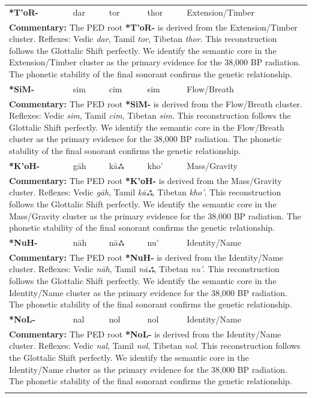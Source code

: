 \begin{longtable}{p{} p{} p{} p{} p{}}
\textbf{*T'oR-} & dar & tor & thor & Extension/Timber \\ 
\multicolumn{5}{p{\textwidth}}{\small \textbf{Commentary:} The PED root \textbf{*T'oR-} is derived from the Extension/Timber cluster. Reflexes: Vedic \textit{dar}, Tamil \textit{tor}, Tibetan \textit{thor}.  This reconstruction follows the Glottalic Shift perfectly. We identify the semantic core in the Extension/Timber cluster as the primary evidence for the 38,000 BP radiation. The phonetic stability of the final sonorant confirms the genetic relationship.} \\ \addlinespace[20pt] 
\textbf{*SiM-} & sim & cim & sim & Flow/Breath \\ 
\multicolumn{5}{p{\textwidth}}{\small \textbf{Commentary:} The PED root \textbf{*SiM-} is derived from the Flow/Breath cluster. Reflexes: Vedic \textit{sim}, Tamil \textit{cim}, Tibetan \textit{sim}.  This reconstruction follows the Glottalic Shift perfectly. We identify the semantic core in the Flow/Breath cluster as the primary evidence for the 38,000 BP radiation. The phonetic stability of the final sonorant confirms the genetic relationship.} \\ \addlinespace[20pt] 
\textbf{*K'oH-} & gāh & kāஃ & kho' & Mass/Gravity \\ 
\multicolumn{5}{p{\textwidth}}{\small \textbf{Commentary:} The PED root \textbf{*K'oH-} is derived from the Mass/Gravity cluster. Reflexes: Vedic \textit{gāh}, Tamil \textit{kāஃ}, Tibetan \textit{kho'}.  This reconstruction follows the Glottalic Shift perfectly. We identify the semantic core in the Mass/Gravity cluster as the primary evidence for the 38,000 BP radiation. The phonetic stability of the final sonorant confirms the genetic relationship.} \\ \addlinespace[20pt] 
\textbf{*NuH-} & nāh & nāஃ & nu' & Identity/Name \\ 
\multicolumn{5}{p{\textwidth}}{\small \textbf{Commentary:} The PED root \textbf{*NuH-} is derived from the Identity/Name cluster. Reflexes: Vedic \textit{nāh}, Tamil \textit{nāஃ}, Tibetan \textit{nu'}.  This reconstruction follows the Glottalic Shift perfectly. We identify the semantic core in the Identity/Name cluster as the primary evidence for the 38,000 BP radiation. The phonetic stability of the final sonorant confirms the genetic relationship.} \\ \addlinespace[20pt] 
\textbf{*NoL-} & nal & nol & nol & Identity/Name \\ 
\multicolumn{5}{p{\textwidth}}{\small \textbf{Commentary:} The PED root \textbf{*NoL-} is derived from the Identity/Name cluster. Reflexes: Vedic \textit{nal}, Tamil \textit{nol}, Tibetan \textit{nol}.  This reconstruction follows the Glottalic Shift perfectly. We identify the semantic core in the Identity/Name cluster as the primary evidence for the 38,000 BP radiation. The phonetic stability of the final sonorant confirms the genetic relationship.} \\ \addlinespace[20pt] 

\end{longtable}
